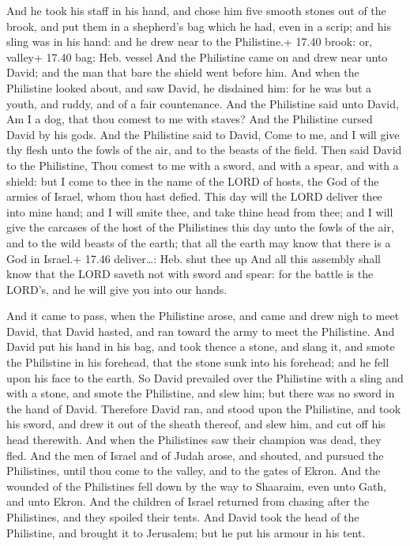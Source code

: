  And he took his staff in his hand, and chose him five
smooth stones out of the brook, and put them in a shepherd's bag which
he had, even in a scrip; and his sling was in his hand: and he drew near
to the Philistine.+ 17.40 brook: or, valley+ 17.40 bag: Heb. vessel
 And the Philistine came on and drew near unto David; and
the man that bare the shield went before him.  And when the
Philistine looked about, and saw David, he disdained him: for he was but
a youth, and ruddy, and of a fair countenance.  And the
Philistine said unto David, Am I a dog, that thou comest to me with
staves? And the Philistine cursed David by his gods.  And
the Philistine said to David, Come to me, and I will give thy flesh unto
the fowls of the air, and to the beasts of the field.  Then
said David to the Philistine, Thou comest to me with a sword, and with a
spear, and with a shield: but I come to thee in the name of the LORD of
hosts, the God of the armies of Israel, whom thou hast defied.
 This day will the LORD deliver thee into mine hand; and I
will smite thee, and take thine head from thee; and I will give the
carcases of the host of the Philistines this day unto the fowls of the
air, and to the wild beasts of the earth; that all the earth may know
that there is a God in Israel.+ 17.46 deliver\ldots: Heb. shut thee up
 And all this assembly shall know that the LORD saveth not
with sword and spear: for the battle is the LORD's, and he will give you
into our hands.

 And it came to pass, when the Philistine arose, and came
and drew nigh to meet David, that David hasted, and ran toward the army
to meet the Philistine.  And David put his hand in his bag,
and took thence a stone, and slang it, and smote the Philistine in his
forehead, that the stone sunk into his forehead; and he fell upon his
face to the earth.  So David prevailed over the Philistine
with a sling and with a stone, and smote the Philistine, and slew him;
but there was no sword in the hand of David.  Therefore
David ran, and stood upon the Philistine, and took his sword, and drew
it out of the sheath thereof, and slew him, and cut off his head
therewith. And when the Philistines saw their champion was dead, they
fled.  And the men of Israel and of Judah arose, and
shouted, and pursued the Philistines, until thou come to the valley, and
to the gates of Ekron. And the wounded of the Philistines fell down by
the way to Shaaraim, even unto Gath, and unto Ekron.  And
the children of Israel returned from chasing after the Philistines, and
they spoiled their tents.  And David took the head of the
Philistine, and brought it to Jerusalem; but he put his armour in his
tent.

